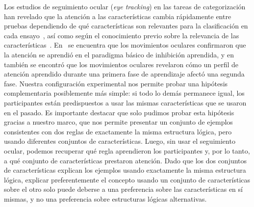 Los estudios de seguimiento ocular ({\em eye tracking}) en las tareas de categorización han revelado que la atención a las características cambia rápidamente entre pruebas dependiendo de qué características son relevantes para la clasificación en cada ensayo~\cite{blair2009extremely}, así como según el conocimiento previo sobre la relevancia de las características~\cite{kim2011prior}. En~\cite{kruschke2005eye} se encuentra que los movimientos oculares confirmaron que la atención se aprendió en el paradigma básico de inhibición aprendida, y en~\cite{hoffman2010costs} también se encontró que los movimientos oculares revelaron cómo un perfil de atención aprendido durante una primera fase de aprendizaje afectó una segunda fase. Nuestra configuración experimental nos permite probar una hipótesis complementaria posiblemente más simple: si todo lo demás permanece igual, los participantes están predispuestos a usar las mismas características que se usaron en el pasado. Es importante destacar que solo pudimos probar esta hipótesis gracias a nuestro marco, que nos permite presentar un conjunto de ejemplos consistentes con dos reglas de exactamente la misma estructura lógica, pero usando diferentes conjuntos de características. Luego, sin usar el seguimiento ocular, podemos recuperar qué regla aprendieron los participantes y, por lo tanto, a qué conjunto de características prestaron atención. Dado que los dos conjuntos de características explican los ejemplos usando exactamente la misma estructura lógica, explicar preferentemente el concepto usando un conjunto de características sobre el otro solo puede deberse a una preferencia sobre las características en sí mismas, y no una preferencia sobre estructuras lógicas alternativas.



